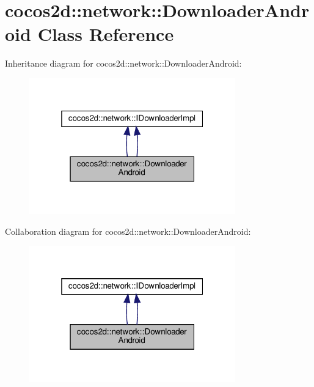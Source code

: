 \hypertarget{classcocos2d_1_1network_1_1DownloaderAndroid}{}\section{cocos2d\+:\+:network\+:\+:Downloader\+Android Class Reference}
\label{classcocos2d_1_1network_1_1DownloaderAndroid}


Inheritance diagram for cocos2d\+:\+:network\+:\+:Downloader\+Android\+:
\nopagebreak
\begin{figure}[H]
\begin{center}
\leavevmode
\includegraphics[width=253pt]{classcocos2d_1_1network_1_1DownloaderAndroid__inherit__graph}
\end{center}
\end{figure}


Collaboration diagram for cocos2d\+:\+:network\+:\+:Downloader\+Android\+:
\nopagebreak
\begin{figure}[H]
\begin{center}
\leavevmode
\includegraphics[width=253pt]{classcocos2d_1_1network_1_1DownloaderAndroid__coll__graph}
\end{center}
\end{figure}
